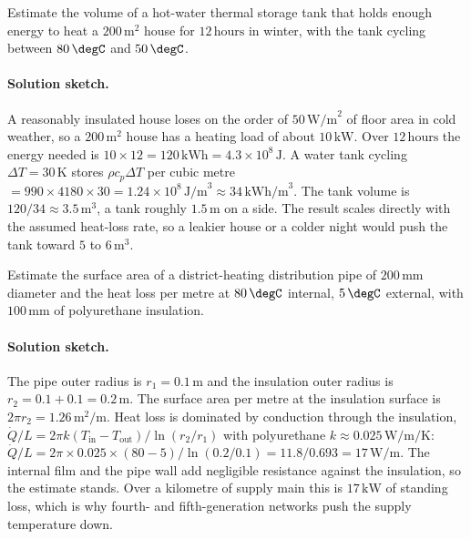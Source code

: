 \begin{exercise}
Estimate the volume of a hot-water thermal storage tank that holds
enough energy to heat a $200\,\text{m}^2$ house for $12\,\text{hours}$
in winter, with the tank cycling between $80\,\degC$ and $50\,\degC$.

\paragraph{Solution sketch.} A reasonably insulated house loses on the
order of $50\,\text{W/m}^2$ of floor area in cold weather, so a $200\,
\text{m}^2$ house has a heating load of about $10\,\text{kW}$. Over
$12\,\text{hours}$ the energy needed is $10 \times 12 = 120\,\text{kWh}
= 4.3 \times 10^8\,\text{J}$. A water tank cycling $\Delta T = 30\,
\si{\kelvin}$ stores $\rho c_p \Delta T$ per cubic metre $= 990 \times
4180 \times 30 = 1.24 \times 10^8\,\text{J/m}^3 \approx 34\,\text{kWh/m}^3$.
The tank volume is $120/34 \approx 3.5\,\text{m}^3$, a tank roughly
$1.5\,\text{m}$ on a side. The result scales directly with the assumed
heat-loss rate, so a leakier house or a colder night would push the
tank toward $5$ to $6\,\text{m}^3$.
\end{exercise}

\begin{exercise}
Estimate the surface area of a district-heating distribution pipe of
$200\,\si{\milli\meter}$ diameter and the heat loss per metre at
$80\,\degC$ internal, $5\,\degC$ external, with $100\,\si{\milli\meter}$
of polyurethane insulation.

\paragraph{Solution sketch.} The pipe outer radius is $r_1 = 0.1\,\text{m}$
and the insulation outer radius is $r_2 = 0.1 + 0.1 = 0.2\,\text{m}$.
The surface area per metre at the insulation surface is $2\pi r_2 =
1.26\,\text{m}^2/\text{m}$. Heat loss is dominated by conduction through
the insulation, $\dot{Q}/L = 2\pi k (T_{\text{in}} - T_{\text{out}})/
\ln(r_2/r_1)$ with polyurethane $k \approx 0.025\,\si{\watt\per\meter
\per\kelvin}$: $\dot{Q}/L = 2\pi \times 0.025 \times (80 - 5)/\ln(0.2/
0.1) = 11.8/0.693 = 17\,\text{W/m}$. The internal film and the pipe
wall add negligible resistance against the insulation, so the estimate
stands. Over a kilometre of supply main this is $17\,\text{kW}$ of
standing loss, which is why fourth- and fifth-generation networks push
the supply temperature down.
\end{exercise}

